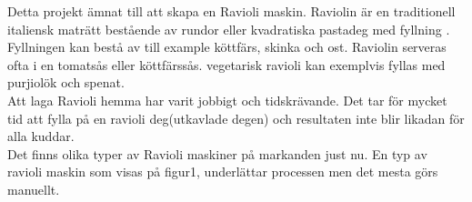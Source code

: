 Detta projekt ämnat till att skapa en Ravioli maskin. Raviolin är en traditionell italiensk maträtt bestående av rundor eller kvadratiska pastadeg med fyllning \cite{engproc}. Fyllningen kan bestå av till example köttfärs, skinka och ost. Raviolin serveras ofta i en tomatsås eller köttfärssås. vegetarisk ravioli kan exemplvis fyllas med purjiolök och spenat.\\

Att laga Ravioli hemma har varit jobbigt och tidskrävande. Det tar för mycket tid att fylla på en ravioli deg(utkavlade degen) och resultaten inte blir likadan för alla kuddar.\\

Det finns olika typer av Ravioli maskiner på markanden just nu. En typ av ravioli maskin som visas på figur1, underlättar processen men det mesta görs manuellt.\\

